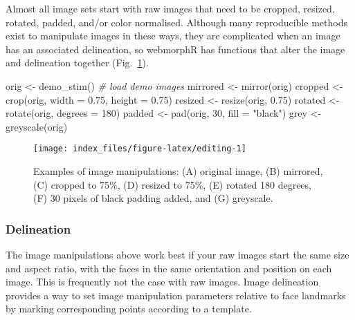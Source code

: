 \documentclass[
  doc,floatsintext]{apa6}
\newenvironment{Shaded}{\begin{snugshade}}{\end{snugshade}}
\newcommand{\AttributeTok}[1]{\textcolor[rgb]{0.77,0.63,0.00}{#1}}
\newcommand{\CommentTok}[1]{\textcolor[rgb]{0.56,0.35,0.01}{\textit{#1}}}
\newcommand{\DecValTok}[1]{\textcolor[rgb]{0.00,0.00,0.81}{#1}}
\newcommand{\FloatTok}[1]{\textcolor[rgb]{0.00,0.00,0.81}{#1}}
\newcommand{\FunctionTok}[1]{\textcolor[rgb]{0.00,0.00,0.00}{#1}}
\newcommand{\NormalTok}[1]{#1}
\newcommand{\OtherTok}[1]{\textcolor[rgb]{0.56,0.35,0.01}{#1}}
\newcommand{\StringTok}[1]{\textcolor[rgb]{0.31,0.60,0.02}{#1}}
\begin{document}
Almost all image sets start with raw images that need to be cropped, resized, rotated, padded, and/or color normalised. Although many reproducible methods exist to manipulate images in these ways, they are complicated when an image has an associated delineation, so webmorphR has functions that alter the image and delineation together (Fig.~\ref{fig:editing}).

\begin{Shaded}
\begin{Highlighting}[]
\NormalTok{orig }\OtherTok{\textless{}{-}} \FunctionTok{demo\_stim}\NormalTok{() }\CommentTok{\# load demo images}
\NormalTok{mirrored }\OtherTok{\textless{}{-}} \FunctionTok{mirror}\NormalTok{(orig)}
\NormalTok{cropped  }\OtherTok{\textless{}{-}} \FunctionTok{crop}\NormalTok{(orig, }\AttributeTok{width =} \FloatTok{0.75}\NormalTok{, }\AttributeTok{height =} \FloatTok{0.75}\NormalTok{)}
\NormalTok{resized  }\OtherTok{\textless{}{-}} \FunctionTok{resize}\NormalTok{(orig, }\FloatTok{0.75}\NormalTok{)}
\NormalTok{rotated  }\OtherTok{\textless{}{-}} \FunctionTok{rotate}\NormalTok{(orig, }\AttributeTok{degrees =} \DecValTok{180}\NormalTok{)}
\NormalTok{padded   }\OtherTok{\textless{}{-}} \FunctionTok{pad}\NormalTok{(orig, }\DecValTok{30}\NormalTok{, }\AttributeTok{fill =} \StringTok{"black"}\NormalTok{)}
\NormalTok{grey     }\OtherTok{\textless{}{-}} \FunctionTok{greyscale}\NormalTok{(orig)}
\end{Highlighting}
\end{Shaded}



\begin{figure}
\texttt{[image: index\_files/figure-latex/editing-1]} \caption{Examples of image manipulations: (A) original image, (B) mirrored, (C) cropped to 75\%, (D) resized to 75\%, (E) rotated 180 degrees, (F) 30 pixels of black padding added, and (G) greyscale.}\label{fig:editing}
\end{figure}

\hypertarget{delineation}{%
\subsubsection{Delineation}\label{delineation}}

The image manipulations above work best if your raw images start the same size and aspect ratio, with the faces in the same orientation and position on each image. This is frequently not the case with raw images. Image delineation provides a way to set image manipulation parameters relative to face landmarks by marking corresponding points according to a template.
\end{document}
